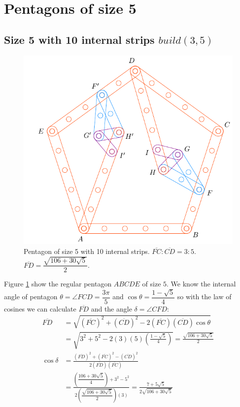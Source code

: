 \documentclass[11pt]{article}
\begin{document}

\section{Pentagons of size 5}

\subsection{Size 5 with 10 internal strips $build(3,5)$}

\begin{figure}[H]
\centering
\includegraphics[scale=0.9]{5/penta5-10a}
\caption{Pentagon of size 5 with 10 internal strips. $\overline{FC} : \overline{CD} = 3:5$. $\overline{FD} = \dfrac{\sqrt{106 + 30\sqrt5}}2$.}
\label{fig:penta5-10a}
\end{figure}

Figure \ref{fig:penta5-10a} show the regular pentagon $ABCDE$ of size $5$. We know the internal angle of pentagon $\theta=\angle{FCD} =\dfrac{3\pi}5$ and $\cos\theta=\dfrac{1-\sqrt5}4$ so with the law of cosines we can calculate $\overline{FD}$ and the angle $\delta = \angle{CFD}$:
\begin{align}
\overline{FD} &= \sqrt{(\overline{FC})^2 + (\overline{CD})^2
 - 2(\overline{FC})(\overline{CD})\cos\theta} \nonumber\\
 &= \sqrt{3^2 + 5^2 - 2(3)(5)\left(\frac{1-\sqrt5}4\right)} = \frac{\sqrt{106 + 30\sqrt5}}2\\
%
\cos\delta &= \frac{(\overline{FD})^2 + (\overline{FC})^2 - (\overline{CD})^2}
 {2(\overline{FD})(\overline{FC})} \nonumber\\
 &= \frac{\left(\dfrac{106+30\sqrt5}4\right) + 3^2 - 5^2}
  {2\left(\dfrac{\sqrt{106+30\sqrt5}}2\right)(3)}
  = \frac{7 + 5\sqrt5}{2\sqrt{106 + 30\sqrt5}}
\end{align}
\end{document}

